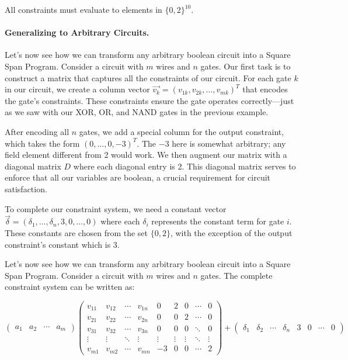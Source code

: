 All constraints must evaluate to elements in $\{0, 2\}^{10}$. 

\paragraph{Generalizing to Arbitrary Circuits.}

Let's now see how we can transform any arbitrary boolean circuit into a Square Span Program. Consider a circuit with $m$ wires and $n$ gates. Our first task is to construct a matrix that captures all the constraints of our circuit. For each gate $k$ in our circuit, we create a column vector $\vec{v_k} = (v_{1k}, v_{2k}, \ldots, v_{mk})^T$ that encodes the gate's constraints. These constraints ensure the gate operates correctly—just as we saw with our XOR, OR, and NAND gates in the previous example.

After encoding all $n$ gates, we add a special column for the output constraint, which takes the form $(0,\ldots,0,-3)^T$. The $-3$ here is somewhat arbitrary; any field element different from 2 would work. We then augment our matrix with a diagonal matrix $D$ where each diagonal entry is 2. This diagonal matrix serves to enforce that all our variables are boolean, a crucial requirement for circuit satisfaction.

To complete our constraint system, we need a constant vector $\vec{\delta} = (\delta_1,\ldots,\delta_n,3,0,\ldots,0)$ where each $\delta_i$ represents the constant term for gate $i$. These constants are chosen from the set $\{0,2\}$, with the exception of the output constraint's constant which is 3.

Let's now see how we can transform any arbitrary boolean circuit into a Square Span Program. Consider a circuit with $m$ wires and $n$ gates. The complete constraint system can be written as:

\[ \begin{pmatrix} a_1 & a_2 & \cdots & a_m \end{pmatrix}
\begin{pmatrix}
v_{11} & v_{12} & \cdots & v_{1n} & 0 & 2 & 0 & \cdots & 0 \\
v_{21} & v_{22} & \cdots & v_{2n} & 0 & 0 & 2 & \cdots & 0 \\
v_{31} & v_{32} & \cdots & v_{3n} & 0 & 0 & 0 & \ddots & 0 \\
\vdots & \vdots & \ddots & \vdots & \vdots & \vdots & \vdots & \ddots & \vdots \\
v_{m1} & v_{m2} & \cdots & v_{mn} & -3 & 0 & 0 & \cdots & 2
\end{pmatrix} + \begin{pmatrix} \delta_1 & \delta_2 & \cdots & \delta_n & 3 & 0 & \cdots & 0 \end{pmatrix} \]

